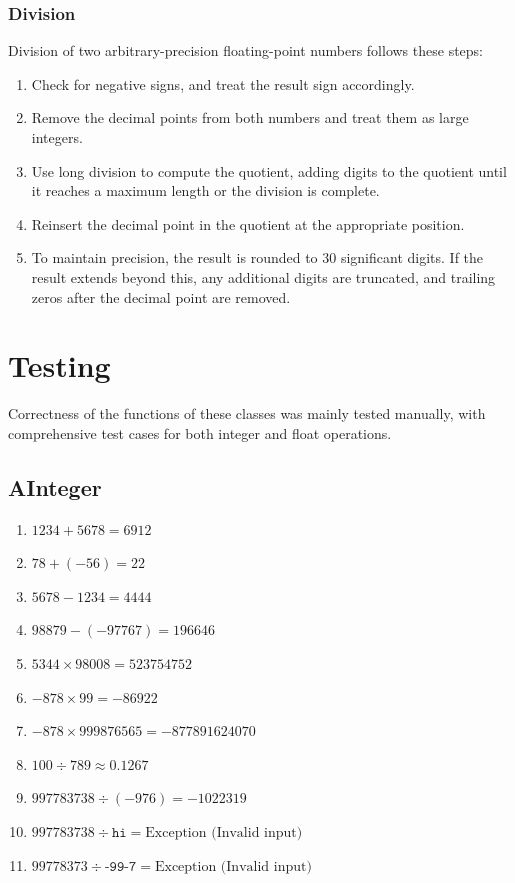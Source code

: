 \documentclass[12pt]{article}
\begin{document}
\subsubsection{Division}
Division of two arbitrary-precision floating-point numbers follows these steps:
\begin{enumerate}
    \item Check for negative signs, and treat the result sign accordingly.
    \item Remove the decimal points from both numbers and treat them as large integers.
    \item Use long division to compute the quotient, adding digits to the quotient until it reaches a maximum length or the division is complete.
    \item Reinsert the decimal point in the quotient at the appropriate position.
    \item To maintain precision, the result is rounded to 30 significant digits. If the result extends beyond this, any additional digits are truncated, and trailing zeros after the decimal point are removed.
\end{enumerate}

\section{Testing}

Correctness of the functions of these classes was mainly tested manually, with comprehensive test cases for both integer and float operations.
\subsection{AInteger}
\begin{enumerate}
    \item \(1234 + 5678 = 6912\)
    \item \(78 + (-56) = 22\)
    \item \(5678 - 1234 = 4444\)
    \item \(98879 - (-97767) = 196646\)
    \item \(5344 \times 98008 = 523754752\)
    \item \(-878 \times 99 = -86922\)
    \item \(-878 \times 999876565 = -877891624070\)
    \item \(100 \div 789 \approx 0.1267\)
    \item \(997783738 \div (-976) = -1022319\)
    \item \(997783738 \div \texttt{hi} = \text{Exception (Invalid input)}\)
    \item \(99778373 \div \texttt{-99-7} = \text{Exception (Invalid input)}\)

\end{enumerate}
\end{document}
